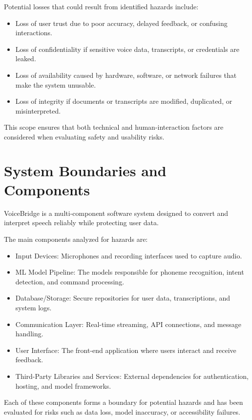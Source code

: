 \documentclass{article}
\begin{document}
\vspace{3mm}
\noindent Potential losses that could result from identified hazards include:
\begin{itemize}
    \item Loss of user trust due to poor accuracy, delayed feedback, or confusing interactions. 
    \item Loss of confidentiality if sensitive voice data, transcripts, or credentials are leaked.
    \item Loss of availability caused by hardware, software, or network failures that make the system unusable.
    \item Loss of integrity if documents or transcripts are modified, duplicated, or misinterpreted.
\end{itemize}

\noindent This scope ensures that both technical and human-interaction factors are considered when evaluating safety and usability risks.

\section{System Boundaries and Components}

VoiceBridge is a multi-component software system designed to convert and interpret speech reliably while protecting user data. 

\vspace{3mm}
\noindent The main components analyzed for hazards are:

\begin{itemize}
    \item Input Devices: Microphones and recording interfaces used to capture audio.
    \item ML Model Pipeline: The models responsible for phoneme recognition, intent detection, and command processing.
    \item Database/Storage: Secure repositories for user data, transcriptions, and system logs.
    \item Communication Layer: Real-time streaming, API connections, and message handling.
    \item User Interface: The front-end application where users interact and receive feedback.
    \item Third-Party Libraries and Services: External dependencies for authentication, hosting, and model frameworks.
\end{itemize}

\noindent Each of these components forms a boundary for potential hazards and has been evaluated for risks such as data loss, model inaccuracy, or accessibility failures.
\end{document}
